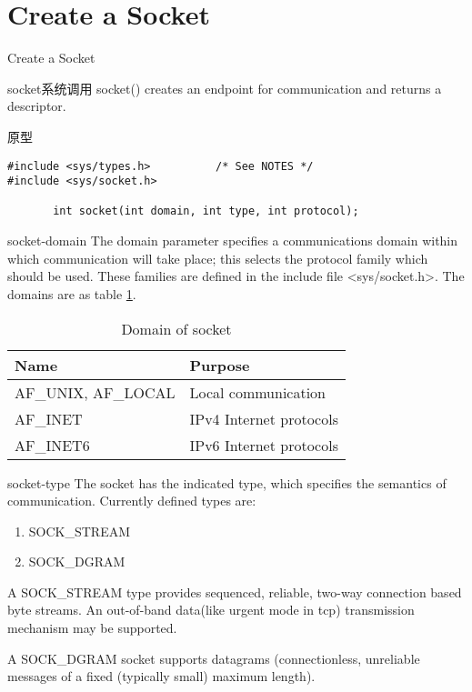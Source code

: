 \documentclass{beamer}
\begin{document}
\section{Create a Socket}
\begin{frame}
\Huge{\centerline{Create a Socket}}
\end{frame}
\begin{frame}[fragile]{socket系统调用}
socket() creates an endpoint for communication and returns a descriptor.
\begin{block}{原型}
\begin{verbatim}
#include <sys/types.h>          /* See NOTES */
#include <sys/socket.h>

       int socket(int domain, int type, int protocol);
\end{verbatim}
\end{block}
\end{frame}
\begin{frame}{socket-domain}
     The domain parameter specifies a communications domain within which communication will take place; this selects the protocol family which should be used.  These families are defined in
     the include file <sys/socket.h>.  The domains are as table \ref{skt-dm}.
\begin{table}
\begin{tabular}{ll}
\toprule
\textbf{Name}&\textbf{Purpose}\\
\midrule                                                       
       AF\_UNIX, AF\_LOCAL &  Local communication     \\        
       AF\_INET       &      IPv4 Internet protocols    \\      
       AF\_INET6     &       IPv6 Internet protocols     \\     
 \bottomrule
 \end{tabular}
\caption{Domain of socket}
\label{skt-dm}
\end{table}

\end{frame}
\begin{frame}{socket-type}
     The socket has the indicated type, which specifies the semantics of communication.  Currently defined types are:
\begin{enumerate}
\item
SOCK\_STREAM
\item   
SOCK\_DGRAM
\end{enumerate}
     A SOCK\_STREAM type provides sequenced, reliable, two-way connection based byte streams.  An out-of-band data(like urgent mode in tcp) transmission mechanism may be supported.  
     
     A SOCK\_DGRAM socket supports datagrams (connectionless, unreliable messages of a fixed (typically small) maximum length). 
\end{frame}
\end{document}
